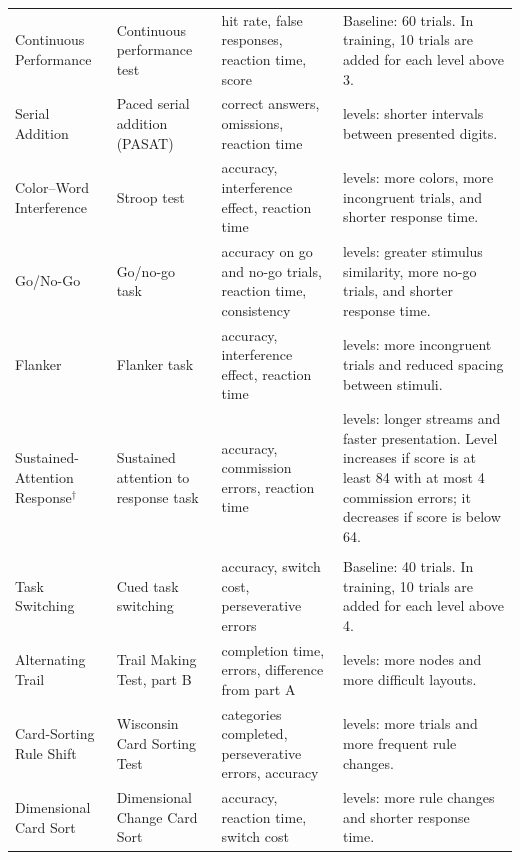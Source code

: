 \documentclass[11pt,a4paper]{article}
\begin{document}
\begin{longtable}{
>{\raggedright\arraybackslash}p{2.9cm}
>{\raggedright\arraybackslash}p{3.2cm}
>{\raggedright\arraybackslash}p{4.2cm}
>{\raggedright\arraybackslash}p{5.5cm}
}
Continuous Performance
& Continuous performance test~\cite{R12}
& hit rate, false responses, reaction time, score
& Baseline: 60 trials. In training, 10 trials are added for each level above 3. \\

Serial Addition
& Paced serial addition (PASAT)~\cite{R13}
& correct answers, omissions, reaction time
& 10 levels: shorter intervals between presented digits. \\

Color--Word Interference
& Stroop test~\cite{R14}
& accuracy, interference effect, reaction time
& 10 levels: more colors, more incongruent trials, and shorter response time. \\

Go/No-Go
& Go/no-go task~\cite{R30,R31}
& accuracy on go and no-go trials, reaction time, consistency
& 10 levels: greater stimulus similarity, more no-go trials, and shorter response time. \\

Flanker
& Flanker task~\cite{R15}
& accuracy, interference effect, reaction time
& 10 levels: more incongruent trials and reduced spacing between stimuli. \\

Sustained-Attention Response$^\dagger$
& Sustained attention to response task~\cite{R16}
& accuracy, commission errors, reaction time
& 10 levels: longer streams and faster presentation. Level increases if score is at least 84 with at most 4 commission errors; it decreases if score is below 64. \\

\midrule
\multicolumn{4}{l}{\textbf{Flexibility}} \\*

Task Switching
& Cued task switching~\cite{R17}
& accuracy, switch cost, perseverative errors
& Baseline: 40 trials. In training, 10 trials are added for each level above 4. \\

Alternating Trail
& Trail Making Test, part B~\cite{R8}
& completion time, errors, difference from part A
& 10 levels: more nodes and more difficult layouts. \\

Card-Sorting Rule Shift
& Wisconsin Card Sorting Test~\cite{R18}
& categories completed, perseverative errors, accuracy
& 10 levels: more trials and more frequent rule changes. \\

Dimensional Card Sort
& Dimensional Change Card Sort~\cite{R19}
& accuracy, reaction time, switch cost
& 10 levels: more rule changes and shorter response time. \\


\end{longtable}
\end{document}
